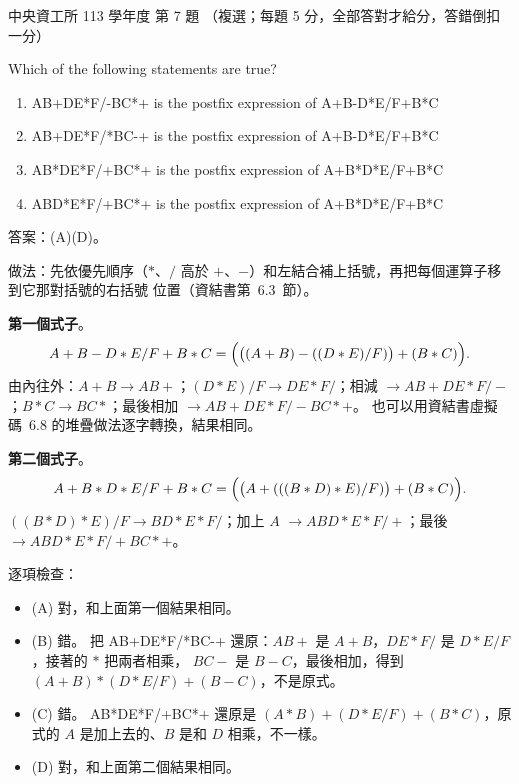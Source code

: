 \begin{pastexam}[label={px:ncu-113-dsa-07}]{中央資工所 113 學年度 第 7 題}
（複選；每題 5 分，全部答對才給分，答錯倒扣一分）

Which of the following statements are true?
\begin{enumerate}[label=(\Alph*)]
\item AB+DE*F/-BC*+ is the postfix expression of A+B-D*E/F+B*C
\item AB+DE*F/*BC-+ is the postfix expression of A+B-D*E/F+B*C
\item AB*DE*F/+BC*+ is the postfix expression of A+B*D*E/F+B*C
\item ABD*E*F/+BC*+ is the postfix expression of A+B*D*E/F+B*C
\end{enumerate}
\end{pastexam}

\begin{pastsoln}
答案：(A)(D)。

做法：先依優先順序（$*$、$/$ 高於 $+$、$-$）和左結合補上括號，再把每個運算子移到它那對括號的右括號
位置（資結書第~6.3~節）。

\textbf{第一個式子}。
\[
A+B-D*E/F+B*C = \Bigl(\bigl((A+B) - ((D*E)/F)\bigr) + (B*C)\Bigr).
\]
由內往外：$A+B \to AB+$；$(D*E)/F \to DE*F/$；相減 $\to AB+DE*F/-$；$B*C \to BC*$；最後相加
$\to AB+DE*F/-BC*+$。 也可以用資結書虛擬碼~6.8 的堆疊做法逐字轉換，結果相同。

\textbf{第二個式子}。
\[
A+B*D*E/F+B*C = \Bigl(\bigl(A + (((B*D)*E)/F)\bigr) + (B*C)\Bigr).
\]
$((B*D)*E)/F \to BD*E*F/$；加上 $A$ $\to ABD*E*F/+$；最後 $\to ABD*E*F/+BC*+$。

逐項檢查：
\begin{itemize}
\item (A) 對，和上面第一個結果相同。
\item (B) 錯。 把 AB+DE*F/*BC-+ 還原：$AB+$ 是 $A+B$，$DE*F/$ 是 $D*E/F$，接著的 $*$ 把兩者相乘，
$BC-$ 是 $B-C$，最後相加，得到 $(A+B)*(D*E/F) + (B-C)$，不是原式。
\item (C) 錯。 AB*DE*F/+BC*+ 還原是 $(A*B) + (D*E/F) + (B*C)$，原式的 $A$ 是加上去的、$B$ 是和 $D$
相乘，不一樣。
\item (D) 對，和上面第二個結果相同。
\end{itemize}
\end{pastsoln}
